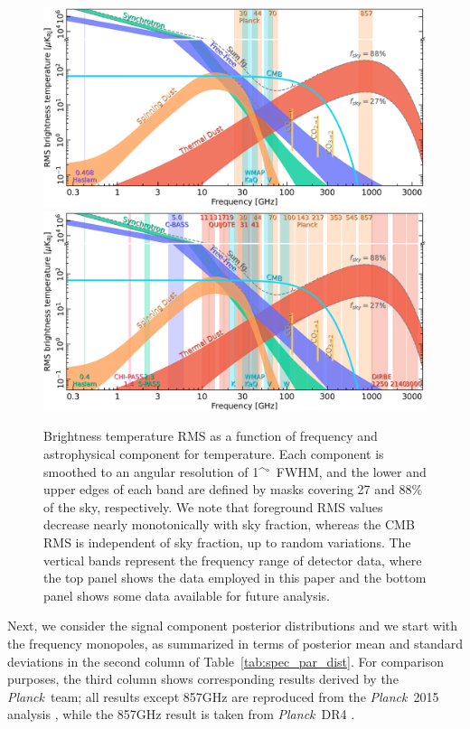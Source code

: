 \documentclass{aa}
\def\Planck{\textit{Planck}}
\def\,{\thinspace}
\def\deg{\ifmmode^\circ\else$^\circ$\fi}
\begin{document}
\begin{figure}
  \center       
  \includegraphics[width=\linewidth]{figs/spectrum_BP_T.pdf}
  \includegraphics[width=\linewidth]{figs/spectrum_long.pdf}  
  \caption{Brightness temperature RMS as a function of frequency and astrophysical
    component for temperature. Each component is smoothed to an angular resolution
    of 1\deg\ FWHM, and the lower and upper edges of each band are defined by
    masks covering 27 and 88\,\% of the sky, respectively. We note that foreground RMS values decrease nearly monotonically with sky fraction, whereas the CMB RMS is independent of sky
    fraction, up to random variations. The vertical bands represent the frequency range of detector data, where the top panel shows the data employed in this paper and the bottom panel shows some data available for future analysis. 
    }
  \label{fig:fg_comp_spectrum}
\end{figure}


Next, we consider the signal component posterior distributions
and we start with the frequency monopoles, as summarized in terms of
posterior mean and standard deviations in the second column of
Table~\ref{tab:spec_par_dist}. For comparison purposes, the third
column shows corresponding results derived by the \Planck\ team; all
results except 857\,GHz are reproduced from the \Planck\ 2015 analysis
\citep{planck2014-a12}, while the 857\,GHz result is taken from
\Planck\ DR4 \citep{npipe}.
\end{document}
